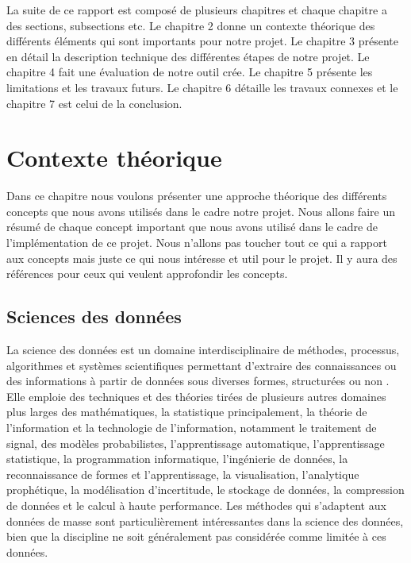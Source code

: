 \documentclass[12pt, french]{report}
\begin{document}
La suite de ce rapport est composé de plusieurs chapitres et chaque chapitre a des sections, subsections etc. Le chapitre 2 donne un contexte théorique des différents éléments qui sont importants pour notre projet. Le chapitre 3 présente en détail la description technique des différentes étapes de notre projet. Le chapitre 4 fait une évaluation de notre outil crée. Le chapitre 5 présente les limitations et les travaux futurs. Le chapitre 6 détaille les travaux connexes et le chapitre 7 est celui de la conclusion.


\newpage

\chapter{Contexte théorique}

Dans ce chapitre nous voulons présenter une approche théorique des différents concepts que nous avons utilisés dans le cadre notre projet. Nous allons faire un résumé de chaque concept important que nous avons utilisé dans le cadre de l'implémentation de ce projet. Nous n'allons pas toucher tout ce qui a rapport aux concepts mais juste ce qui nous intéresse et util pour le projet. Il y aura des références pour ceux qui veulent approfondir les concepts. 

\section{Sciences des données}

La science des données est un domaine interdisciplinaire de méthodes, processus, algorithmes et systèmes scientifiques permettant d'extraire des connaissances ou des informations à partir de données sous diverses formes, structurées ou non \cite{key5}. Elle emploie des techniques et des théories tirées de plusieurs autres domaines plus larges des mathématiques, la statistique principalement, la théorie de l'information et la technologie de l'information, notamment le traitement de signal, des modèles probabilistes, l'apprentissage automatique, l'apprentissage statistique, la programmation informatique, l'ingénierie de données, la reconnaissance de formes et l'apprentissage, la visualisation, l'analytique prophétique, la modélisation d'incertitude, le stockage de données, la compression de données et le calcul à haute performance. Les méthodes qui s'adaptent aux données de masse sont particulièrement intéressantes dans la science des données, bien que la discipline ne soit généralement pas considérée comme limitée à ces données.\\
	
\end{document}
